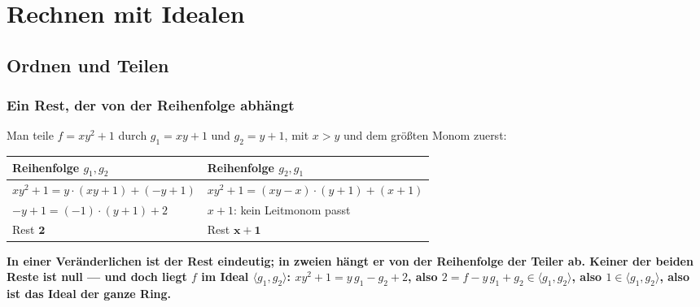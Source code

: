 \part{Rechnen mit Idealen}

\chapter{Ordnen und Teilen}

\section{Ein Rest, der von der Reihenfolge abhängt}

\begin{merksatz}
Man teile $f = xy^{2} + 1$ durch $g_1 = xy + 1$ und $g_2 = y + 1$, mit $x > y$ und dem größten Monom zuerst:
\begin{center}
{\small
\renewcommand{\arraystretch}{1.5}
\begin{tabular}{@{}P{4.2cm}P{4.4cm}@{}}
\toprule
\textbf{Reihenfolge $g_1, g_2$} & \textbf{Reihenfolge $g_2, g_1$}\\
\midrule
$xy^{2} + 1 = y\cdot(xy + 1) + (-y + 1)$ & $xy^{2} + 1 = (xy - x)\cdot(y + 1) + (x + 1)$\\
$-y + 1 = (-1)\cdot(y + 1) + 2$ & $x + 1$: kein Leitmonom passt\\
Rest $\mathbf 2$ & Rest $\mathbf{x + 1}$\\
\bottomrule
\end{tabular}}
\end{center}

\begin{center}
\begin{minipage}{0.9\textwidth}
\textbf{In einer Veränderlichen ist der Rest eindeutig; in zweien hängt er von der Reihenfolge der Teiler ab. Keiner der beiden Reste ist null --- und doch liegt $f$ im Ideal $\langle g_1, g_2\rangle$: $xy^{2} + 1 = y\,g_1 - g_2 + 2$, also $2 = f - y\,g_1 + g_2\in\langle g_1, g_2\rangle$, also $1\in\langle g_1, g_2\rangle$, also ist das Ideal der ganze Ring.}
\end{minipage}
\end{center}

\begin{center}
\begin{minipage}{0.88\textwidth}
\end{minipage}
\end{center}
\end{merksatz}

